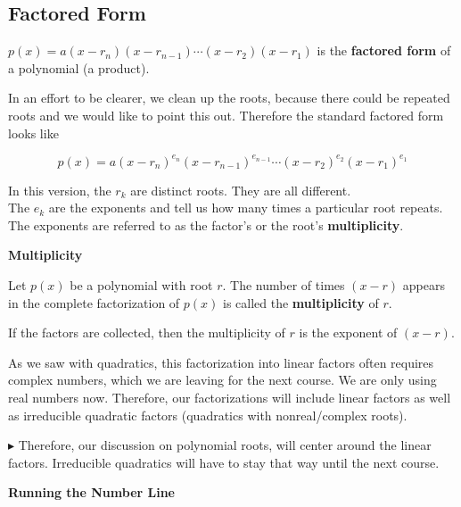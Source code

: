 \documentclass{ximera}
\begin{document}
\subsection*{Factored Form}


$p(x) = a (x-r_n)(x-r_{n-1})  \cdots (x-r_2)(x-r_1)$ is the \textbf{factored form} of a polynomial (a product).  

In an effort to be clearer, we clean up the roots, because there could be repeated roots and we would like to point this out.  Therefore the standard factored form looks like




\[   p(x) = a (x-r_n)^{e_n} (x-r_{n-1})^{e_{n-1}}  \cdots (x-r_2)^{e_2} (x-r_1)^{e_1}  \]



In this version, the $r_k$ are distinct roots.  They are all different. \\
The $e_k$ are the exponents and tell us how many times a particular root repeats.  The exponents are referred to as the factor's or the root's \textbf{multiplicity}.




\begin{definition} \textbf{\textcolor{green!50!black}{Multiplicity}} 

Let $p(x)$ be a polynomial with root $r$.  The number of times $(x - r)$ appears in the complete factorization of $p(x)$ is called the \textbf{multiplicity} of $r$.

If the factors are collected, then the multiplicity of $r$ is the exponent of $(x-r)$.

\end{definition}

As we saw with quadratics, this factorization into linear factors often requires complex numbers, which we are leaving for the next course. We are only using real numbers now.  Therefore, our factorizations will include linear factors as well as irreducible quadratic factors (quadratics with nonreal/complex roots).

\textbf{\textcolor{red!70!darkgray}{$\blacktriangleright$}}  Therefore, our discussion on polynomial roots, will center around the linear factors.  Irreducible quadratics will have to stay that way until the next course.










\textbf{\large Running the Number Line}
\end{document}
